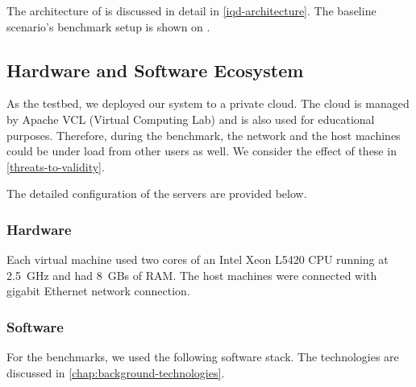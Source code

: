 The architecture of \iqd{} is discussed in detail in \autoref{iqd-architecture}. The baseline scenario's benchmark setup is shown on .


\subsection{Hardware and Software Ecosystem}
\label{ecosystem}

As the testbed, we deployed our system to a private cloud. The cloud is managed by Apache VCL (Virtual Computing Lab) and is also used for educational purposes. Therefore, during the benchmark, the network and the host machines could be under load from other users as well. We consider the effect of these in \autoref{threats-to-validity}.

The detailed configuration of the servers are provided below.

\subsubsection{Hardware}
 
Each virtual machine used two cores of an Intel Xeon L5420 CPU running at 2.5~GHz and had 8~GBs of RAM. The host machines were connected with gigabit Ethernet network connection.

\subsubsection{Software}

For the benchmarks, we used the following software stack. The technologies are discussed in \autoref{chap:background-technologies}.

